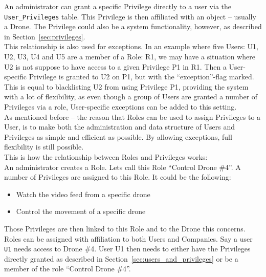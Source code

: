 \label{sec:users_and_privileges}
An administrator can grant a specific Privilege directly to a user via the \verb+User_Privileges+ table.
This Privilege is then affiliated with an object -- usually a Drone.
The Privilege could also be a system functionality, however, as described in Section~\ref{sec:privileges}. \\

This relationship is also used for exceptions.
In an example where five Users: U1, U2, U3, U4 and U5 are a member of a Role: R1, we may have a situation where U2 is not suppose to have access to a given Privilege P1 in R1.
Then a User-specific Privilege is granted to U2 on P1, but with the ``exception''-flag marked.
This is equal to blacklisting U2 from using Privilege P1, providing the system with a lot of flexibility, as even though a group of Users are granted a number of Privileges via a role, User-specific exceptions can be added to this setting. \\


As mentioned before -- the reason that Roles can be used to assign Privileges to a User, is to make both the administration and data structure of Users and Privileges as simple and efficient as possible.
By allowing exceptions, full flexibility is still possible. \\

This is how the relationship between Roles and Privileges works: \\

An administrator creates a Role.
Lets call this Role ``Control Drone \#4''.
A number of Privileges are assigned to this Role.
It could be the following:

\begin{itemize}
    \item Watch the video feed from a specific drone
    \item Control the movement of a specific drone
\end{itemize}

Those Privileges are then linked to this Role and to the Drone this concerns. \\

Roles can be assigned with affiliation to both Users and Companies.
Say a user \verb+U1+ needs access to Drone \#4.
User U1 then needs to either have the Privileges directly granted as described in Section~\ref{sec:users_and_privileges} or be a member of the role ``Control Drone \#4''.


